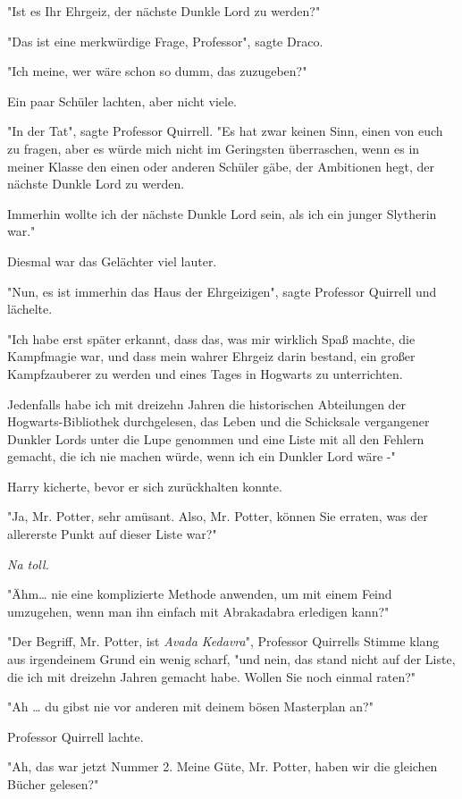 {"Ist es Ihr Ehrgeiz, der nächste Dunkle Lord zu werden?"

"Das ist eine merkwürdige Frage, Professor", sagte Draco.

"Ich meine, wer wäre schon so dumm, das zuzugeben?"

Ein paar Schüler lachten, aber nicht viele.

"In der Tat", sagte Professor Quirrell. "Es hat zwar keinen Sinn, einen von euch zu fragen, aber es würde mich nicht im Geringsten überraschen, wenn es in meiner Klasse den einen oder anderen Schüler gäbe, der Ambitionen hegt, der nächste Dunkle Lord zu werden.

Immerhin wollte ich der nächste Dunkle Lord sein, als ich ein junger Slytherin war."

Diesmal war das Gelächter viel lauter.

"Nun, es ist immerhin das Haus der Ehrgeizigen", sagte Professor Quirrell und lächelte.

"Ich habe erst später erkannt, dass das, was mir wirklich Spaß machte, die Kampfmagie war, und dass mein wahrer Ehrgeiz darin bestand, ein großer Kampfzauberer zu werden und eines Tages in Hogwarts zu unterrichten.

Jedenfalls habe ich mit dreizehn Jahren die historischen Abteilungen der Hogwarts-Bibliothek durchgelesen, das Leben und die Schicksale vergangener Dunkler Lords unter die Lupe genommen und eine Liste mit all den Fehlern gemacht, die ich nie machen würde, wenn ich ein Dunkler Lord wäre -"

Harry kicherte, bevor er sich zurückhalten konnte.

"Ja, Mr. Potter, sehr amüsant. Also, Mr. Potter, können Sie erraten, was der allererste Punkt auf dieser Liste war?"

\emph{Na toll.}

"Ähm… nie eine komplizierte Methode anwenden, um mit einem Feind umzugehen, wenn man ihn einfach mit Abrakadabra erledigen kann?"

"Der Begriff, Mr. Potter, ist \emph{Avada Kedavra}", Professor Quirrells Stimme klang aus irgendeinem Grund ein wenig scharf, "und nein, das stand nicht auf der Liste, die ich mit dreizehn Jahren gemacht habe. Wollen Sie noch einmal raten?"

"Ah … du gibst nie vor anderen mit deinem bösen Masterplan an?"

Professor Quirrell lachte.

"Ah, das war jetzt Nummer 2. Meine Güte, Mr. Potter, haben wir die gleichen Bücher gelesen?"

}
